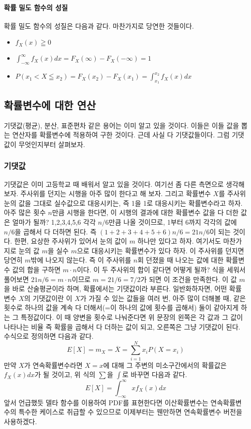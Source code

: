 \paragraph{확률 밀도 함수의 성질}
확률 밀도 함수의 성질은 다음과 같다. 마찬가지로 당연한 것들이다.
\begin{itemize}
    \item $f_X(x)\geqq 0$
    \item $\int_{-\infty}^{\infty}f_X(x)dx=F_X(\infty)-F_X(-\infty)=1$
    \item $P(x_1<X\leqq x_2)=F_X(x_2)-F_X(x_1)=\int_{x_1}^{x_2}f_X(x)dx$
\end{itemize}
\subsection{확률변수에 대한 연산}
기댓값(평균), 분산, 표준편차 같은 용어는 이미 알고 있을 것이다. 이들은 이들 값을 뽑는 연산자를 확률변수에 적용하여 구한 것이다. 근데 사실 다 기댓값들이다.
그럼 기댓값이 무엇인지부터 살펴보자.
\subsubsection{기댓값}\label{기댓값}
기댓값은 이미 고등학교 때 배워서 알고 있을 것이다. 여기선 좀 다른 측면으로 생각해보자.
주사위를 던지는 시행을 아주 많이 한다고 해 보자. 그리고 확률변수 $X$를 주사위 눈의 값을 그대로 실수값으로 대응시키는, 즉 1을 1로 대응시키는 확률변수라고 하자.
아주 많은 횟수 $n$만큼 시행을 한다면, 이 시행의 결과에 대한 확률변수 값을 다 더한 값은 얼마가 될까? 1,2,3,4,5,6 각각 $n/6$만큼 나올 것이므로, 1부터 6까지 각각의 값에 $n/6$을 곱해서 다 더하면 된다.
즉 $(1+2+3+4+5+6)n/6=21n/6$이 되는 것이다.
한편, 요상한 주사위가 있어서 눈의 값이 $m$ 하나만 있다고 하자. 여기서도 마찬가지로 눈의 값 $m$을 실수 $m$으로 대응시키는 확률변수가 있다 하자. 이 주사위를 던지면 당연히 $m$밖에 나오지 않는다. 즉 이 주사위를 $n$회 던졌을 때 나오는 값에 대한 확률변수 값의 합을 구하면 $m\cdot n$이다.
이 두 주사위의 합이 같다면 어떻게 될까? 식을 세워서 풀어보면 $21n/6 = m\cdot n$이므로 $m=21/6=7/2$가 되면 이 조건을 만족한다. 이 값 $m$을 바로 산술평균이라 하며, 확률에서는 기댓값이라 부른다.
일반화하자면, 어떤 확률변수 $X$의 기댓값이란 이 $X$가 가질 수 있는 값들을 여러 번, 아주 많이 더해볼 때, 같은 횟수로 하나의 값을 계속 다 더해서(=이 하나의 값에 횟수를 곱해서) 둘이 같아지게 하는 그 특정값이다.
이 때 양변을 횟수로 나눠준다면 위 문장의 왼쪽은 각 값과 그 값이 나타나는 비율 즉 확률을 곱해서 다 더하는 값이 되고, 오른쪽은 그냥 기댓값이 된다.
수식으로 정의하면 다음과 같다.
\begin{equation}
    E[X]=m_X=\overline{X}= \sum_{i=1}^{N}x_iP(X=x_i)
\end{equation}
만약 $X$가 연속확률변수라면 $X=x$에 대해 그 주변의 미소구간에서의 확률값은 $f_X(x)dx$가 될 것이고, 위 식의 $\sum$을 $\int$로 바꾸면 다음과 같다.
\begin{equation}
    E[X]=\int_{-\infty}^{\infty}xf_X(x)dx
\end{equation}
앞서 언급했듯 델타 함수를 이용하여 PDF를 표현한다면 이산확률변수는 연속확률변수의 특수한 케이스로 취급할 수 있으므로 이제부터는 웬만하면 연속확률변수 버전을 사용하겠다.

